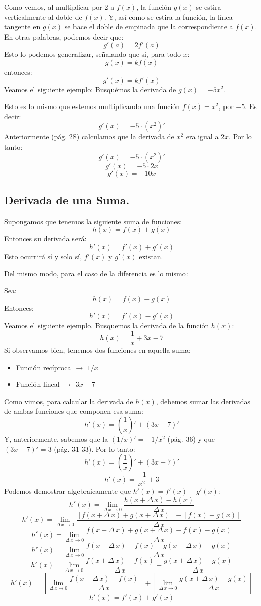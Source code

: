 \documentclass[12pt]{article}
\begin{document}
Como vemos, al multiplicar por 2 a $f(x)$, la función $g(x)$ se estira verticalmente al doble de $f(x)$. Y, así como se estira la función, la línea tangente en $g(x)$ se hace el doble de empinada que la correspondiente a $f(x)$. En otras palabras, podemos decir que:
\[g'(a) = 2f'(a)\]
Esto lo podemos generalizar, señalando que si, para todo $x$:
\[g(x) = kf(x)\]
entonces: 
\[g'(x) = kf'(x)\]
Veamos el siguiente ejemplo: Busquémos la derivada de $g(x) = -5x^{2}$.

Esto es lo mismo que estemos multiplicando una función $f(x) = x^{2}$, por $-5$. Es decir:
\[g'(x) = -5 \cdot (x^{2})'\]
Anteriormente (pág. 28) calculamos que la derivada de $x^{2}$ era igual a $2x$. Por lo tanto:
\[g'(x) = -5 \cdot (x^{2})'\]
\[g'(x) = -5 \cdot 2x\]
\[g'(x) = -10x\]




\subsection{Derivada de una Suma.}

Supongamos que tenemos la siguiente \underline{suma de funciones}:
\[h(x) = f(x) + g(x)\]
Entonces su derivada será:
\[h'(x) = f'(x) + g'(x)\]
Esto ocurrirá sí y solo sí, $f'(x)$ y $g'(x)$ existan.

Del mismo modo, para el caso de \underline{la diferencia} es lo mismo:

Sea:
\[h(x) = f(x) - g(x)\]
Entonces:
\[h'(x) = f'(x) - g'(x)\]
Veamos el siguiente ejemplo. Busquemos la derivada de la función $h(x)$:
\[h(x) = \frac{1}{x}+3x-7\]
Si observamos bien, tenemos dos funciones en aquella suma:
\begin{itemize}
\item Función recíproca $\rightarrow$ $1/x$
\item Función lineal $\rightarrow$ $3x-7$
\end{itemize}

Como vimos, para calcular la derivada de $h(x)$, debemos sumar las derivadas de ambas funciones que componen esa suma:
\[h'(x) = \left(\frac{1}{x}\right)' + (3x-7)'\]
Y, anteriormente, sabemos que la $(1/x)' = -1/x^{2}$ (pág. 36) y que $(3x-7)' = 3$ (pág. 31-33). Por lo tanto:
\[h'(x) = \left(\frac{1}{x}\right)' + (3x-7)'\]
\[h'(x) = \frac{-1}{x^{2}} + 3\]
Podemos demostrar algebraicamente que $h'(x) = f'(x) + g'(x)$:
\[h'(x) = \lim_{\Delta \, x \to 0} \frac{h(x + \Delta\, x) - h(x)}{\Delta \, x}\]
\[h'(x) = \lim_{\Delta \, x \to 0} \frac{[f(x + \Delta\, x) + g(x + \Delta\, x)] - [f(x) + g(x)]}{\Delta \, x}\]
\[h'(x) = \lim_{\Delta \, x \to 0} \frac{f(x + \Delta\, x) + g(x + \Delta\, x) - f(x) - g(x)}{\Delta \, x}\]
\[h'(x) = \lim_{\Delta \, x \to 0} \frac{f(x + \Delta\, x) - f(x) + g(x + \Delta\, x) - g(x)}{\Delta \, x}\]
\[h'(x) = \lim_{\Delta \, x \to 0} \frac{f(x + \Delta\, x) - f(x)}{\Delta \, x} + \frac{g(x + \Delta\, x) - g(x)}{\Delta \, x}\]
\[h'(x) = \left[\lim_{\Delta \, x \to 0} \frac{f(x + \Delta\, x) - f(x)}{\Delta \, x}\right] + \left[\lim_{\Delta \, x \to 0} \frac{g(x + \Delta\, x) - g(x)}{\Delta \, x}\right]\]
\[h'(x) = f'(x) + g'(x)\]
\end{document}
